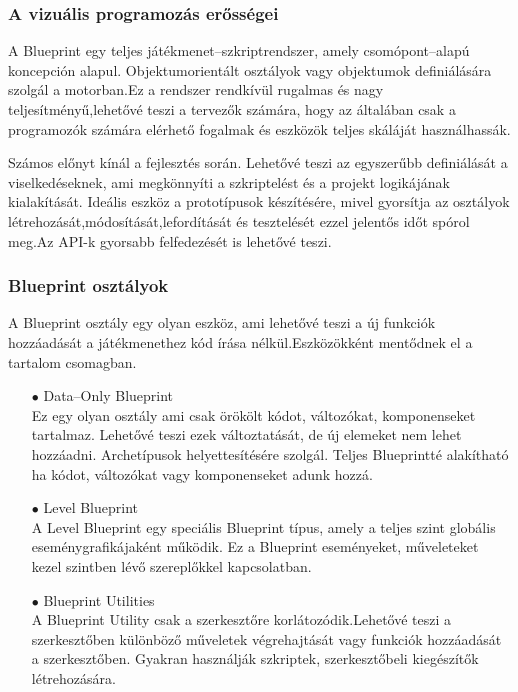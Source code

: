 \documentclass[
]{thesis-ekf}
\theoremstyle{definition}
\theoremstyle{remark}
\begin{document}
\subsubsection{A vizuális programozás erősségei}
A Blueprint egy teljes játékmenet--szkriptrendszer, amely csomópont--alapú koncepción alapul. Objektumorientált osztályok vagy objektumok definiálására szolgál a motorban.Ez a rendszer rendkívül rugalmas és nagy teljesítményű,lehetővé teszi a tervezők számára, hogy az általában csak a programozók számára elérhető fogalmak és eszközök teljes skáláját használhassák.

Számos előnyt kínál a fejlesztés során. Lehetővé teszi az egyszerűbb definiálását a viselkedéseknek, ami megkönnyíti a szkriptelést és a projekt logikájának kialakítását. Ideális eszköz a prototípusok készítésére, mivel gyorsítja az osztályok létrehozását,módosítását,lefordítását és tesztelését ezzel jelentős időt spórol meg.Az API-k gyorsabb felfedezését is lehetővé teszi.
\subsubsection{Blueprint osztályok}
A Blueprint osztály egy olyan eszköz, ami lehetővé teszi a új funkciók hozzáadását a játékmenethez kód írása nélkül.Eszközökként mentődnek el a tartalom csomagban.
\begin{itemize}
	\item[$\bullet$] Data--Only Blueprint \\ Ez egy olyan osztály ami csak örökölt kódot, változókat, komponenseket tartalmaz. Lehetővé teszi ezek változtatását, de új elemeket nem lehet hozzáadni. Archetípusok helyettesítésére szolgál. Teljes Blueprintté alakítható ha kódot, változókat vagy komponenseket adunk hozzá.
	\item[$\bullet$] Level Blueprint \\ A Level Blueprint egy speciális Blueprint típus, amely a teljes szint globális eseménygrafikájaként működik. Ez a Blueprint eseményeket, műveleteket kezel szintben lévő szereplőkkel kapcsolatban.
	\item[$\bullet$] Blueprint Utilities \\ A Blueprint Utility csak a szerkesztőre korlátozódik.Lehetővé teszi a szerkesztőben különböző  műveletek végrehajtását vagy funkciók hozzáadását a szerkesztőben. Gyakran használják szkriptek, szerkesztőbeli kiegészítők létrehozására. 
\end{itemize}
\end{document}
